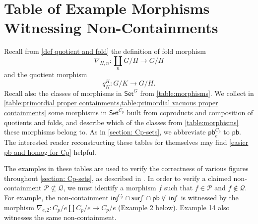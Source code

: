 \documentclass{amsart}
\newcommand{\Set}{\mathsf{Set}}
\newcommand{\GSet}{\Set^G}
\newcommand{\CpSet}{\Set^{C_p}}
\newcommand{\inj}{\mathsf{inj}}
\newcommand{\surj}{\mathsf{surj}}
\newcommand{\pb}{\mathsf{pb}}
\numberwithin{equation}{section}
\theoremstyle{definition}
\begin{document}
\clearpage
\appendix
{}

\section{Table of Example Morphisms Witnessing Non-Containments}
\label{appendix:proper containments}

Recall from \cref{def quotient and fold} the definition of fold morphism
\[
	\nabla_{H,n} \colon \coprod_{n} G/H \to G/H
\]
and the quotient morphism
\[
	q^H_K \colon G/K \to G/H.
\]
Recall also the classes of morphisms in $\GSet$ from \cref{table:morphisms}.
We collect in \cref{table:primordial proper containments,table:primordial vacuous proper containments} some morphisms in $\CpSet$ built from coproducts and composition of quotients and folds, and describe which of the classes from \cref{table:morphisms} these morphisms belong to. As in \cref{section: Cp-sets}, we abbreviate $\pb^{C_p}_e$ to $\pb$. The interested reader reconstructing these tables for themselves may find \cref{easier pb and homog for Cp} helpful.

The examples in these tables are used to verify the correctness of various figures throughout \cref{section: Cp-sets}, as described in . In order to verify a claimed non-containment $\mathcal{P} \nsubseteq \mathcal{Q}$, we must identify a morphism $f$ such that $f \in \mathcal{P}$ and $f \notin \mathcal{Q}$. For example, the non-containment $\inj^{C_p} \cap \surj^e \cap \pb \nsubseteq \inj^e$ is witnessed by the morphism $\nabla_{e,2} \colon C_p/e \amalg C_p/e \to C_p/e$ (Example 2 below). Example 14 also witnesses the same non-containment.
\end{document}
